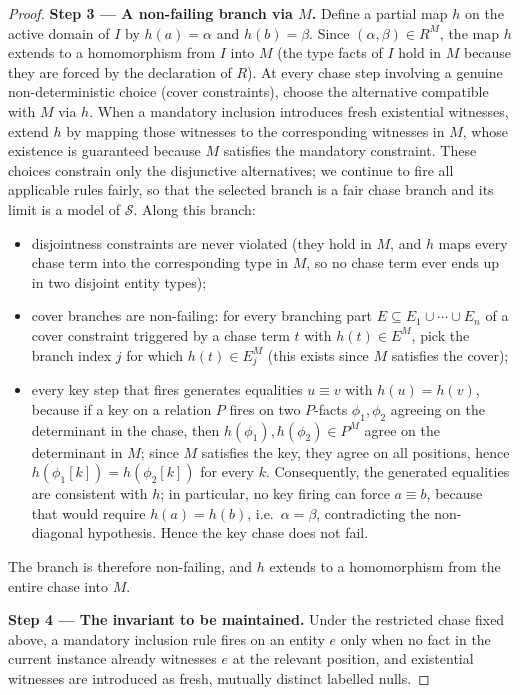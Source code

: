 \documentclass[10pt]{article}
\begin{document}
\begin{proof}
\smallskip\noindent\textbf{Step 3 --- A non-failing branch via \(M\).}
Define a partial map \(h\) on the active domain of \(I\) by
\(h(a)=\alpha\) and \(h(b)=\beta\).  Since
\((\alpha,\beta)\in R^M\), the map \(h\) extends to a homomorphism
from \(I\) into \(M\) (the type facts of \(I\) hold in \(M\) because
they are forced by the declaration of \(R\)).  At every chase step
involving a genuine non-deterministic choice (cover constraints),
choose the alternative compatible with \(M\) via \(h\).  When a
mandatory inclusion introduces fresh existential witnesses, extend
\(h\) by mapping those witnesses to the corresponding witnesses in
\(M\), whose existence is guaranteed because \(M\) satisfies the
mandatory constraint.  These choices constrain only the disjunctive
alternatives; we continue to fire all applicable rules fairly, so
that the selected branch is a fair chase branch and its limit is a
model of \(\mathcal S\).
Along this branch:
\begin{itemize}
\item disjointness constraints are never violated (they hold in \(M\), and
\(h\) maps every chase term into the corresponding type in \(M\), so
no chase term ever ends up in two disjoint entity types);
\item cover branches are non-failing: for every branching part
\(E\subseteq E_1\cup\cdots\cup E_n\) of a cover constraint triggered by a chase term \(t\)
with \(h(t)\in E^M\), pick the branch index \(j\) for which
\(h(t)\in E_j^M\) (this exists since \(M\) satisfies the cover);
\item every key step that fires generates equalities \(u\equiv v\)
with \(h(u)=h(v)\), because if a key on a relation \(P\) fires on
two \(P\)-facts \(\phi_1,\phi_2\) agreeing on the determinant in
the chase, then \(h(\phi_1),h(\phi_2)\in P^M\) agree on the
determinant in \(M\); since \(M\) satisfies the key, they agree on
all positions, hence \(h(\phi_1[k])=h(\phi_2[k])\) for every \(k\).
Consequently, the generated equalities are consistent with \(h\); in
particular, no key firing can force \(a\equiv b\), because that
would require \(h(a)=h(b)\), i.e.\ \(\alpha=\beta\), contradicting
the non-diagonal hypothesis.  Hence the key chase does not fail.
\end{itemize}
The branch is therefore non-failing, and \(h\) extends to a
homomorphism from the entire chase into \(M\).

\smallskip\noindent\textbf{Step 4 --- The invariant to be maintained.}
Under the restricted chase fixed above, a mandatory inclusion rule fires on
an entity \(e\) only when no fact in the current instance already
witnesses \(e\) at the relevant position, and existential witnesses
are introduced as fresh, mutually distinct labelled nulls.


\end{proof}
\end{document}

